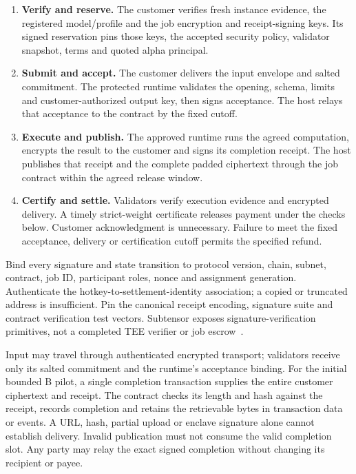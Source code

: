\begin{enumerate}
\tightlist
\item
  \textbf{Verify and reserve.} The customer verifies fresh instance evidence,
  the registered model/profile and the job encryption and receipt-signing
  keys. Its signed reservation pins those keys, the accepted security
  policy, validator snapshot, terms and quoted alpha principal.
\item
  \textbf{Submit and accept.} The customer delivers the input envelope
  and salted commitment. The protected runtime validates the opening,
  schema, limits and customer-authorized output key, then signs acceptance.
  The host relays that acceptance to the contract by the fixed cutoff.
\item
  \textbf{Execute and publish.} The approved runtime runs the agreed
  computation, encrypts the result to the customer and signs its completion
  receipt. The host publishes that receipt and the complete padded
  ciphertext through the job contract within the agreed release window.
\item
  \textbf{Certify and settle.} Validators verify execution evidence and
  encrypted delivery. A timely strict-weight certificate releases
  payment under the checks below. Customer acknowledgment is unnecessary.
  Failure to meet the fixed acceptance, delivery or certification cutoff
  permits the specified refund.
\end{enumerate}

Bind every signature and state transition to protocol version, chain,
subnet, contract, job ID, participant roles, nonce and assignment
generation. Authenticate the hotkey-to-settlement-identity association;
a copied or truncated address is insufficient. Pin the canonical
receipt encoding, signature suite and contract verification test vectors.
Subtensor exposes signature-verification primitives, not a completed TEE
verifier or job escrow~\cite{evmkeys}.

Input may travel through authenticated encrypted transport; validators
receive only its salted commitment and the runtime's acceptance binding.
For the initial bounded B pilot, a single completion transaction supplies
the entire customer ciphertext and receipt. The contract checks its
length and hash against the receipt, records completion and retains the
retrievable bytes in transaction data or events. A URL, hash, partial
upload or enclave signature alone cannot establish delivery. Invalid
publication must not consume the valid completion slot. Any party may
relay the exact signed completion without changing its recipient or payee.


